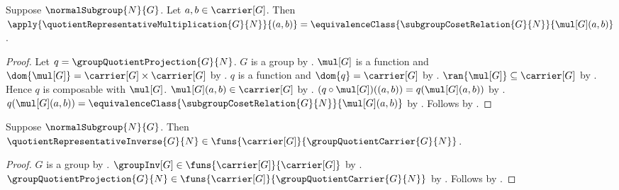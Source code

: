 \begin{proposition}\label{quotient_representative_multiplication_apply}
    Suppose $\normalSubgroup{N}{G}$.
    Let $a,b\in\carrier[G]$.
    Then
        $\apply{\quotientRepresentativeMultiplication{G}{N}}{(a,b)}=
            \equivalenceClass
                {\subgroupCosetRelation{G}{N}}
                {\mul[G](a,b)}$.
\end{proposition}
\begin{proof}
    Let $q=\groupQuotientProjection{G}{N}$.
    $G$ is a group by .
    $\mul[G]$ is a function and $\dom{\mul[G]}=
        \carrier[G]\times\carrier[G]$ by
        .
    $q$ is a function and $\dom{q}=\carrier[G]$ by
        .
    $\ran{\mul[G]}\subseteq\carrier[G]$ by
        .
    Hence $q$ is composable with $\mul[G]$.
    $\mul[G](a,b)\in\carrier[G]$ by
        .
    $(q\circ\mul[G])((a,b))=q(\mul[G](a,b))$ by
        .
    $q(\mul[G](a,b))=
        \equivalenceClass
            {\subgroupCosetRelation{G}{N}}
            {\mul[G](a,b)}$ by
        .
    Follows by .
\end{proof}

\begin{proposition}\label{quotient_representative_inverse_type}
    Suppose $\normalSubgroup{N}{G}$.
    Then $\quotientRepresentativeInverse{G}{N}\in
        \funs{\carrier[G]}{\groupQuotientCarrier{G}{N}}$.
\end{proposition}
\begin{proof}
    $G$ is a group by .
    $\groupInv[G]\in\funs{\carrier[G]}{\carrier[G]}$ by
        .
    $\groupQuotientProjection{G}{N}\in
        \funs{\carrier[G]}{\groupQuotientCarrier{G}{N}}$ by
        .
    Follows by .
\end{proof}

